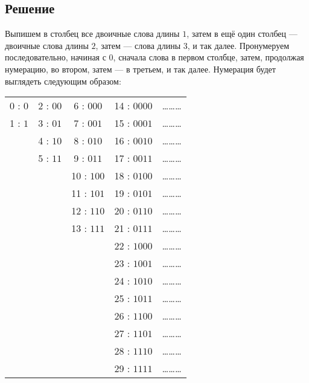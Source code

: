 \documentclass[a4paper,12pt]{article}
\begin{document}
	\subsection*{Решение}
	Выпишем в столбец все двоичные слова длины $1$, затем в ещё один столбец --- двоичные слова длины $2$, затем --- слова длины $3$, и так далее. Пронумеруем последовательно, начиная с $0$, сначала слова в первом столбце, затем, продолжая нумерацию, во втором, затем --- в третьем, и так далее. Нумерация будет выглядеть следующим образом: \bigskip\\
	{
	\boldmath
	\begin{tabular}{c c c c c}
	   0 : $0$  & 2 : $00$ & \phantom{1}6 : $000$ & 14 : $0000$ & \ldots\ldots\ldots\\
	   1 : $1$  & 3 : $01$ & \phantom{1}7 : $001$ & 15 : $0001$ & \ldots\ldots\ldots\\
	            & 4 : $10$ & \phantom{1}8 : $010$ & 16 : $0010$ & \ldots\ldots\ldots\\
	            & 5 : $11$ & \phantom{1}9 : $011$ & 17 : $0011$ & \ldots\ldots\ldots\\
	            &          & 10 : $100$           & 18 : $0100$ & \ldots\ldots\ldots\\
	            &          & 11 : $101$           & 19 : $0101$ & \ldots\ldots\ldots\\
	            &          & 12 : $110$           & 20 : $0110$ & \ldots\ldots\ldots\\
                &          & 13 : $111$           & 21 : $0111$ & \ldots\ldots\ldots\\
	            &          &                      & 22 : $1000$ & \ldots\ldots\ldots\\
	            &          &                      & 23 : $1001$ & \ldots\ldots\ldots\\
	            &          &                      & 24 : $1010$ & \ldots\ldots\ldots\\
	            &          &                      & 25 : $1011$ & \ldots\ldots\ldots\\
	            &          &                      & 26 : $1100$ & \ldots\ldots\ldots\\
	            &          &                      & 27 : $1101$ & \ldots\ldots\ldots\\
	            &          &                      & 28 : $1110$ & \ldots\ldots\ldots\\
	            &          &                      & 29 : $1111$ & \ldots\ldots\ldots\\
	      
	   \end{tabular}
	}
\end{document}
